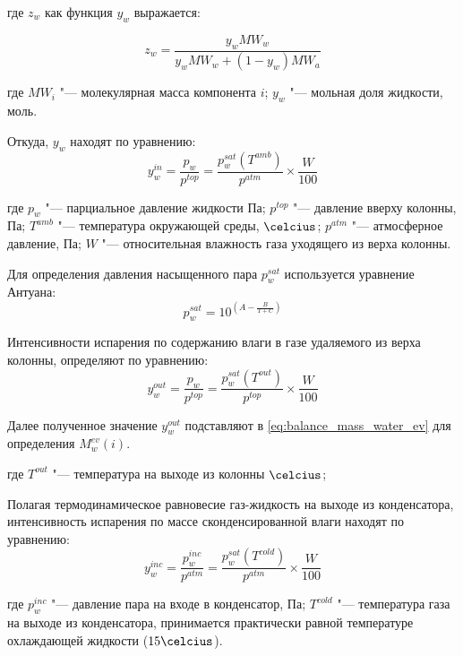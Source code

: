 где \(z_{w}\) как функция \(y_{w}\) выражается:
 
\begin{equation}
{z}_{w}=\frac{{y}_{w}M{W}_{w}}{{y}_{w}M{W}_{w}+\left(1-{y}_{w}\right)M{W}_{a}}\label{eq:balance_mass_fraction}
\end{equation}


где \(M{W}_{i}\) "--- молекулярная масса компонента \(i\);
\({y}_{w}\) "--- мольная доля жидкости, \(моль\).
 

Откуда, \(y_{w}\) находят по уравнению:
\begin{equation}
{y}_{w}^{in}=\frac{{p}_{w}}{{p}^{top}}= \frac{{p}_{w}^{sat}\left({T}^{amb}\right)}{{p}^{atm}}\times\frac{W}{100} 
\end{equation}

где \({p}_{w}\) "--- парциальное давление  жидкости \(Па\);
\({p}^{top}\) "--- давление вверху колонны, \(Па\);
\({T}^{amb}\) "--- температура окружающей среды, \(\celcius\);
\({p}^{atm}\) "--- атмосферное давление, \(Па\);
\(W\) "--- относительная влажность газа уходящего из верха колонны.
 

Для определения давления насыщенного пара \({p}_{w}^{sat}\) используется уравнение Антуана:
\begin{equation}
{p}_{w}^{sat}=10^{\left(A-\frac{B}{T+C}\right)}
\end{equation}

Интенсивности испарения по содержанию влаги в газе удаляемого из верха колонны, определяют по уравнению:
\begin{equation}
{y}_{w}^{out}=\frac{{p}_{w}}{{p}^{top}}= \frac{{p}_{w}^{sat}\left({T}^{out}\right)}{{p}^{top}}\times\frac{W}{100} 
\end{equation}

Далее полученное значение \({y}_{w}^{out}\) подставляют в \cref{eq:balance_mass_water_ev} для определения \({M}_{w}^{ev}(i)\).

где \({T}^{out}\) "--- температура на выходе из колонны \(\celcius\);


Полагая термодинамическое равновесие газ-жидкость на выходе из конденсатора, интенсивность испарения по массе сконденсированной влаги находят по уравнению:
\begin{equation}
{y}_{w}^{inc}=\frac{{p}_{w}^{inc}}{{p}^{atm}}= \frac{{p}_{w}^{sat}\left({T}^{cold}\right)}{{p}^{atm}}\times\frac{W}{100} \end{equation}


где \({p}_{w}^{inc}\) "--- давление пара на входе в конденсатор, \(Па\);
\({T}^{cold}\) "---  температура газа на выходе из конденсатора, принимается практически равной температуре охлаждающей жидкости (\(15\celcius\)).


